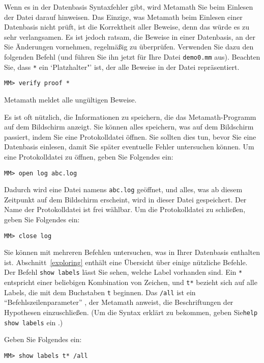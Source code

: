 Wenn es in der Datenbasis Syntaxfehler gibt, wird Metamath Sie beim Einlesen der Datei darauf hinweisen.  Das Einzige, was Metamath beim Einlesen einer Datenbasis nicht prüft, ist die Korrektheit aller Beweise, denn das würde es zu sehr verlangsamen.
Es ist jedoch ratsam, die Beweise in einer Datenbasis, an der Sie Änderungen vornehmen, regelmäßig zu überprüfen.
Verwenden Sie dazu den folgenden Befehl (und führen Sie ihn jetzt für Ihre Datei \texttt{demo0.mm} aus).  Beachten Sie, dass \texttt{*} ein `Platzhalter"' ist, der alle Beweise in der Datei repräsentiert.
\begin{verbatim}
MM> verify proof *
\end{verbatim}
Metamath meldet alle ungültigen Beweise.

Es ist oft nützlich, die Informationen zu speichern, die das Metamath-Programm auf dem Bildschirm anzeigt. Sie können alles speichern, was auf dem Bildschirm passiert, indem Sie eine Protokolldatei öffnen. Sie sollten dies tun, bevor Sie eine Datenbasis einlesen, damit Sie später eventuelle Fehler untersuchen können.  Um eine Protokolldatei zu öffnen, geben Sie Folgendes ein:
\begin{verbatim}
MM> open log abc.log
\end{verbatim}
Dadurch wird eine Datei namens \texttt{abc.log} geöffnet, und alles, was ab diesem Zeitpunkt auf dem Bildschirm erscheint, wird in dieser Datei gespeichert.  Der Name der Protokolldatei ist frei wählbar. Um die Protokolldatei zu schließen, geben Sie Folgendes ein:
\begin{verbatim}
MM> close log
\end{verbatim}

Sie können mit mehreren Befehlen untersuchen, was in Ihrer Datenbasis enthalten ist.
Abschnitt~\ref{exploring} enthält eine Übersicht über einige nützliche Befehle.  Der Befehl \texttt{show labels} lässt Sie sehen, welche Label vorhanden sind.  Ein \texttt{*} entspricht einer beliebigen Kombination von Zeichen, und \texttt{t*} bezieht sich auf alle Labels, die mit dem Buchstaben \texttt{t} beginnen. Das \texttt{/all} ist ein "`Befehlszeilenparameter"' , der Metamath anweist, die Beschriftungen der Hypothesen einzuschließen.  (Um die Syntax erklärt zu bekommen, geben Sie\texttt{help show labels} ein .)

Geben Sie Folgendes ein:
\begin{verbatim}
MM> show labels t* /all
\end{verbatim}

